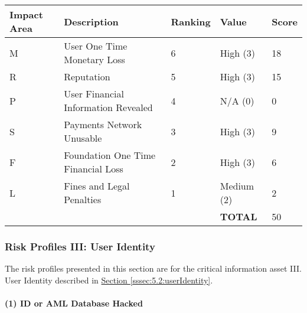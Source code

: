 \documentclass[12pt]{article} %
\newcommand{\hypersectionref}[1]{\hyperref[#1]{Section \ref{#1}}}
\begin{document}
{\begin{center}
\begin{tabular}{ | l | l | l | l | l |}
  \hline
  \textbf{Impact Area} & \textbf{Description} & \textbf{Ranking} & \textbf{Value} & \textbf{Score}
  \\ \hline
  M & User One Time Monetary Loss			& 6	& High (3)		& 18
  \\ \hline
  R & Reputation		& 5	& High (3)		& 15
  \\ \hline
  P & User Financial Information Revealed		& 4	& N/A (0)		& 0
  \\ \hline
  S & Payments Network Unusable					& 3	& High (3)		& 9
  \\ \hline
  F & Foundation One Time Financial Loss	& 2	& High (3)		& 6
  \\ \hline
  L & Fines and Legal Penalties						& 1	& Medium (2)	& 2
  \\ \hline
  & & & \textbf{TOTAL} & 50
  \\ \hline
\end{tabular}
\end{center}
\label{tab:severityBribeKeyCustodian}


\subsubsection{Risk Profiles III: User Identity} \label{sssec:5.3:userIdentityRiskProfiles}

The risk profiles presented in this section are for the critical information asset III. User Identity described in \hypersectionref{sssec:5.2:userIdentity}.

\paragraph{(1) ID or AML Database Hacked }

}
\end{document}
